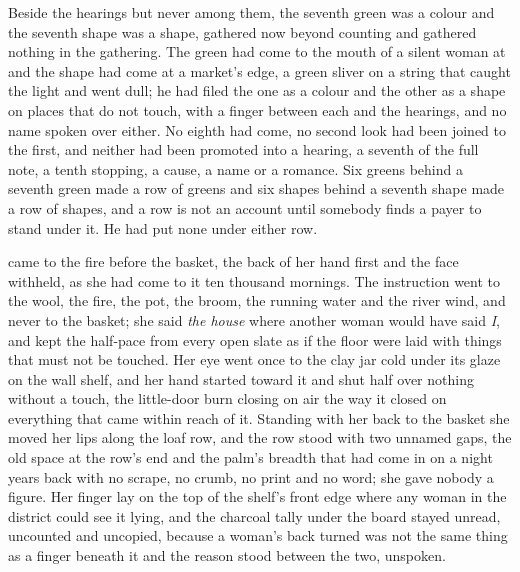 Beside the hearings but never among them, the seventh green was a colour and the seventh shape was a shape, gathered now beyond counting and gathered nothing in the gathering. The green had come to the mouth of a silent woman at  and the shape had come at a market's edge, a green sliver on a string that caught the light and went dull; he had filed the one as a colour and the other as a shape on places that do not touch, with a finger between each and the hearings, and no name spoken over either. No eighth had come, no second look had been joined to the first, and neither had been promoted into a hearing, a seventh of the full note, a tenth stopping, a cause, a name or a romance. Six greens behind a seventh green made a row of greens and six shapes behind a seventh shape made a row of shapes, and a row is not an account until somebody finds a payer to stand under it. He had put none under either row.

\scenebreak

 came to the fire before the basket, the back of her hand first and the face withheld, as she had come to it ten thousand mornings. The instruction went to the wool, the fire, the pot, the broom, the running water and the river wind, and never to the basket; she said \emph{the house} where another woman would have said \emph{I}, and kept the half-pace from every open slate as if the floor were laid with things that must not be touched. Her eye went once to the clay jar cold under its glaze on the wall shelf, and her hand started toward it and shut half over nothing without a touch, the little-door burn closing on air the way it closed on everything that came within reach of it. Standing with her back to the basket she moved her lips along the loaf row, and the row stood with two unnamed gaps, the old space at the row's end and the palm's breadth that had come in on a night years back with no scrape, no crumb, no print and no word; she gave nobody a figure. Her finger lay on the top of the shelf's front edge where any woman in the district could see it lying, and the charcoal tally under the board stayed unread, uncounted and uncopied, because a woman's back turned was not the same thing as a finger beneath it and the reason stood between the two, unspoken.

